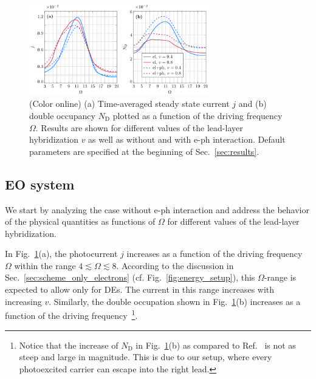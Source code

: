 \documentclass[aps,prb,groupedaddress,showpacs,twocolumn,superscriptaddress,10pt]{revtex4-2}
\begin{document}
\begin{figure}[t]
\includegraphics[width=0.7\textwidth]{Fig3.pdf}
\caption{(Color online) 
 (a) Time-averaged steady state current $j$ and (b) double occupancy $N_{\text{D}}$ plotted as a function of the driving frequency $\Omega$. Results are shown for different values of the lead-layer hybridization $v$ as well as without and with e-ph interaction.
 Default parameters are specified at the beginning of Sec.~\ref{sec:results}.} 
\label{fig:j_vs_omega_mu1_v_0.4_0.8_eph}
\end{figure}

\subsection{EO system}
\label{sec:E0_2_only_electrons}   
 
We start by analyzing the case without e-ph interaction and address the behavior of the physical quantities as functions of $\Omega$ for different values of the lead-layer hybridization.

In Fig.~\ref{fig:j_vs_omega_mu1_v_0.4_0.8_eph}(a), the photocurrent $j$ increases as a function of the driving frequency $\Omega$ within the range $4\lesssim\Omega\lesssim8$. According to the discussion in Sec.~\ref{sec:scheme_only_electrons} (cf.  Fig.~\ref{fig:energy_setup}), this $\Omega$-range is expected to allow only for DEs. The current in this range  increases with increasing $v$. Similarly, the double occupation shown in Fig.~\ref{fig:j_vs_omega_mu1_v_0.4_0.8_eph}(b) increases as a function of the driving frequency~\footnote{Notice that the increase of $N_{\text{D}}$ in Fig.~\ref{fig:j_vs_omega_mu1_v_0.4_0.8_eph}(b) as compared to Ref.~\cite{so.do.18} is not as steep and large in magnitude. This is due to our setup, where every photoexcited carrier can escape into the right lead.}.
\end{document}
